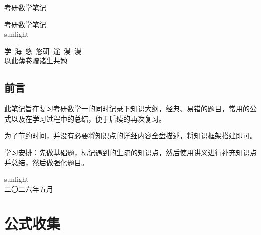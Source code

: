 \documentclass[a4paper,12pt,oneside,fontset=none]{ctexbook}
\newcommand{\MakeTitlePage}{%
    \begin{titlepage}
        \centering
        \vspace*{5cm}
        
        {\fontsize{48pt}{60pt}\selectfont\heavykaishu \color{LogicColor} 考研数学笔记\par}
        
        \vfill
        
        {\LARGE \kaishu 
        考研数学笔记
        \\[0.8em]
        \Large
        sunlight
        \\
        }
    
        \vspace{2.3cm}
        
        {\Large \kaishu
        学\ 海\ 悠\ 悠\quad 研\ 途\ 漫\ 漫
        \\[0.3em]
        {\Large 以此薄卷赠诸生共勉}
        \\[2.5em]
        
        }
        
        \vspace{2cm}
    \end{titlepage}%
}
\numberwithin{equation}{chapter}
\begin{document}
\frontmatter

\MakeTitlePage



\chapter*{前言}
此笔记旨在复习考研数学一的同时记录下知识大纲，经典、易错的题目，常用的公式以及在学习过程中的总结，便于后续的再次复习。

为了节约时间，并没有必要将知识点的详细内容全盘描述，将知识框架搭建即可。

学习安排：先做基础题，标记遇到的生疏的知识点，然后使用讲义进行补充知识点并总结，然后做强化题目。




\vspace{3cm}

\hfill
\begin{minipage}{5cm}
    \centering
    sunlight \\
    二〇二六年五月\\
\end{minipage}


\tableofcontents

\mainmatter



\part{公式收集}
\end{document}
